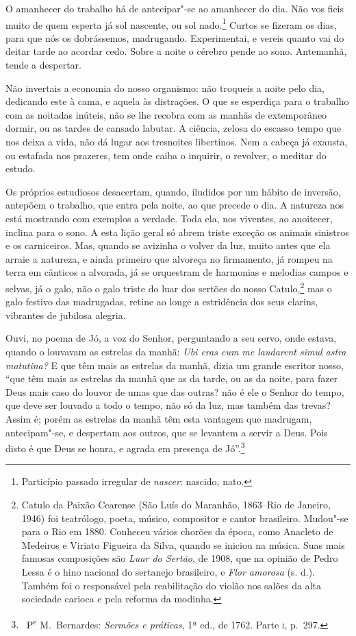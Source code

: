 O amanhecer do trabalho há de antecipar"-se ao amanhecer do dia.
Não vos fieis muito de quem esperta já sol nascente, ou sol
nado.\footnote{ Particípio passado irregular de \textit{nascer}:
nascido, nato.} Curtos se fizeram os dias, para que nós os
dobrássemos, madrugando. Experimentai, e vereis quanto vai do deitar
tarde ao acordar cedo. Sobre a noite o cérebro pende ao sono.
Antemanhã, tende a despertar.

Não invertais a economia do nosso organismo: não troqueis a noite
pelo dia, dedicando este à cama, e aquela às distrações. O que se
esperdiça para o trabalho com as noitadas inúteis, não se lhe recobra
com as manhãs de extemporâneo dormir, ou as tardes de cansado labutar.
A ciência, zelosa do escasso tempo que nos deixa a vida, não dá lugar
aos tresnoites libertinos. Nem a cabeça já exausta, ou estafada nos
prazeres, tem onde caiba o inquirir, o revolver, o meditar do estudo.

Os próprios estudiosos desacertam, quando, iludidos por um hábito
de inversão, antepõem o trabalho, que entra pela noite, ao que precede
o dia. A natureza nos está mostrando com exemplos a verdade. Toda ela,
nos viventes, ao anoitecer, inclina para o sono. A esta lição geral só
abrem triste exceção os animais sinistros e os carniceiros. Mas, quando
se avizinha o volver da luz, muito antes que ela arraie a natureza, e
ainda primeiro que alvoreça no firmamento, já rompeu na terra em
cânticos a alvorada, já se orquestram de harmonias e melodias campos e
selvas, já o galo, não o galo triste do luar dos sertões do nosso
Catulo,\footnote{ Catulo da Paixão Cearense (São
Luís do Maranhão, 1863--Rio de Janeiro, 1946) foi
teatrólogo, poeta, músico, compositor e
cantor brasileiro. Mudou"-se para o Rio em 1880. Conheceu vários
chorões  da época, como Anacleto de Medeiros  e
Viriato Figueira da Silva, quando se iniciou na
música. Suas mais famosas composições são \textit{Luar
do Sertão}, de 1908, que na opinião de Pedro Lessa  
é o hino nacional do sertanejo brasileiro, e 
\textit{Flor amorosa} (s. d.). Também foi o
responsável pela reabilitação do violão nos salões da alta sociedade
carioca e pela reforma da modinha.} mas o galo festivo das
madrugadas, retine ao longe a estridência dos seus clarins, 
vibrantes de jubilosa alegria.

Ouvi, no poema de Jó, a voz do Senhor, perguntando a seu
servo, onde estava, quando o louvavam as estrelas da manhã: \textit{Ubi
eras cum me laudarent simul astra matutina?} E que têm mais as estrelas
da manhã, dizia um grande escritor nosso, ``que têm mais as estrelas da manhã
que as da tarde, ou as da noite, para fazer Deus mais caso do louvor de
umas que das outras? não é ele o Senhor do tempo, que deve ser louvado
a todo o tempo, não só da luz, mas também das trevas? Assim é; porém as
estrelas da manhã têm esta vantagem que madrugam, antecipam"-se, e
despertam aos outros, que se levantem a servir a Deus. Pois disto é que
Deus se honra, e agrada em presença de Jó''.\footnote{\ P\textsuperscript{e} M.~Bernardes: 
\textit{Sermões e práticas}, 1ª ed., de 1762. Parte \textsc{i}, p.~297.}

